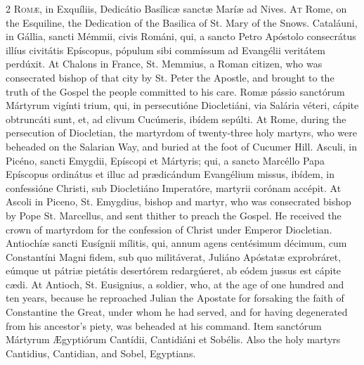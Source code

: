 \begin{paracol}{2}
\lettrine[lines=2]{R}{omæ,} in Exquíliis, 
 Dedicátio Basílicæ sanctæ Maríæ ad Nives.
\switchcolumn
{}
\lettrine[lines=2]{A}{t} Rome, on the Esquiline, the 
 Dedication of the Basilica of St. Mary of the Snows.
\switchcolumn*
{}
Cataláuni, in Gállia, 
 sancti Mémmii, civis Románi, qui, a sancto Petro Apóstolo consecrátus illíus 
 civitátis Epíscopus, pópulum sibi commíssum ad Evangélii veritátem perdúxit.
\switchcolumn
{}
At Chalons in France, St. Memmius, a 
 Roman citizen, who was consecrated bishop of that city by St. Peter the 
 Apostle, and brought to the truth of the Gospel the people committed to his 
 care.
\switchcolumn*
{}
Romæ pássio sanctórum 
 Mártyrum vigínti trium, qui, in persecutióne Diocletiáni, via Salária véteri, 
 cápite obtruncáti sunt, et, ad clivum Cucúmeris, ibídem sepúlti.
\switchcolumn
{}
At Rome, during the persecution of 
 Diocletian, the martyrdom of twenty-three holy martyrs, who were beheaded on 
 the Salarian Way, and buried at the foot of Cucumer Hill.
\switchcolumn*
{}
Asculi, in Picéno, sancti Emygdii, Epíscopi et Mártyris; qui, a sancto Marcéllo Papa Epíscopus 
 ordinátus et illuc ad prædicándum Evangélium missus, ibídem, in confessióne 
 Christi, sub Diocletiáno Imperatóre, martyrii corónam accépit.
\switchcolumn
{}
At Ascoli in Piceno, St. Emygdius, 
 bishop and martyr, who was consecrated bishop by Pope St. Marcellus, and 
 sent thither to preach the Gospel. He received the crown of martyrdom 
 for the confession of Christ under Emperor Diocletian.
\switchcolumn*
{}
Antiochíæ sancti 
 Eusígnii mílitis, qui, annum agens centésimum décimum, cum Constantíni Magni 
 fidem, sub quo militáverat, Juliáno Apóstatæ exprobráret, eúmque ut pátriæ 
 pietátis desertórem redargúeret, ab eódem jussus est cápite cædi.
\switchcolumn
{}
At Antioch, St. Eusignius, a 
 soldier, who, at the age of one hundred and ten years, because he reproached 
 Julian the Apostate for forsaking the faith of Constantine the Great, under 
 whom he had served, and for having degenerated from his ancestor's piety, 
 was beheaded at his command.
\switchcolumn*
{}
Item sanctórum Mártyrum 
 Ægyptiórum Cantídii, Cantidiáni et Sobélis.
\switchcolumn
{}
Also the holy martyrs Cantidius, 
 Cantidian, and Sobel, Egyptians.
\switchcolumn*
{}

\end{paracol}
